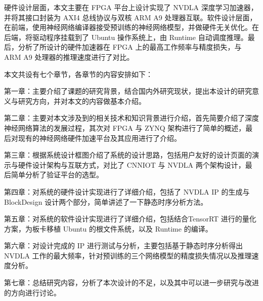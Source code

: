硬件设计层面，本文主要在 FPGA 平台上设计实现了 NVDLA 深度学习加速器，并将其接口封装为 AXI4 总线协议与双核 ARM A9 处理器互联。软件设计层面，在前端，使用神经网络编译器接受预训练的神经网络模型，并做硬件无关优化。在后端，将驱动程序挂载到了 Ubuntu 操作系统上，由 Runtime 自动调度推理。最后，分析了所设计的硬件加速器在 FPGA 上的最高工作频率与精度损失，与 ARM A9 处理器的推理速度进行了对比。

本文共设有七个章节，各章节的内容安排如下：

第一章：主要介绍了课题的研究背景，结合国内外研究现状，提出本设计的研究意义与研究方向，并对本文的内容做基本介绍。

第二章：主要对本文涉及到的相关技术和知识背景进行介绍，首先简要介绍了深度神经网络算法的发展过程，其次对 FPGA 与 ZYNQ 架构进行了简单的概述，最后对现有的神经网络硬件加速平台及其应用进行了介绍。

第三章：根据系统设计框图介绍了系统的设计思路，包括用户友好的设计页面的演示与硬件设计架构与互联方式，对比了 CNNIOT 与 NVDLA 两个架构设计，最后简单分析了验证平台的选型。

第四章：对系统的硬件设计实现进行了详细介绍，包括了 NVDLA IP 的生成与 BlockDesign 设计两个部分，简单讲述了一下静态时序分析方法。

第五章：对系统的软件设计实现进行了详细介绍，包括结合TensorRT 进行的量化方案，为板卡移植 Ubuntu 的根文件系统，以及 Runtime 的编译。

第六章：对设计完成的 IP 进行测试与分析，主要包括基于静态时序分析得出 NVDLA 工作的最大频率，针对预训练的三个网络模型的精度损失情况以及推理速度分析。

第七章：总结研究内容，分析了本次设计的不足，以及其中可以进一步研究与改进的方向进行讨论。



